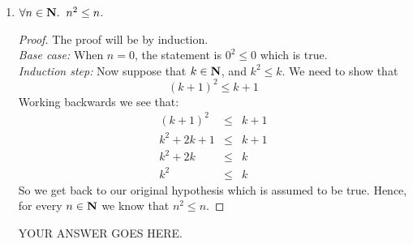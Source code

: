 \documentclass[11pt,fleqn]{article}
\begin{document}
\begin{enumerate}
\begin{enumerate}
\item
\begin{theorem}
$\forall n \in \mbox{{\bfseries N}}.\;\; n^2 \leq n$.
\end{theorem}
\begin{proof}
The proof will be by induction.\\
\emph{Base case:}
When $n=0$, the statement is $0^2 \leq 0$ which is true. \\
\emph{Induction step:}
Now suppose that $k \in \mbox{{\bfseries N}}$, and $k^2 \leq k$.
We need to show that $$(k+1)^2 \leq k+1$$
Working backwards we see that:
\begin{eqnarray*}
(k+1)^2 &\leq& k+1 \\
k^2 + 2k + 1 &\leq& k + 1 \\
k^2 + 2k &\leq& k \\
k^2 &\leq& k
\end{eqnarray*}
So we get back to our original hypothesis which is assumed to be true.
Hence, for every $n \in \mbox{{\bfseries N}}$ we know that $n^2 \leq n$.
\end{proof}

YOUR ANSWER GOES HERE.

\end{enumerate}
\end{enumerate}
\end{document}
